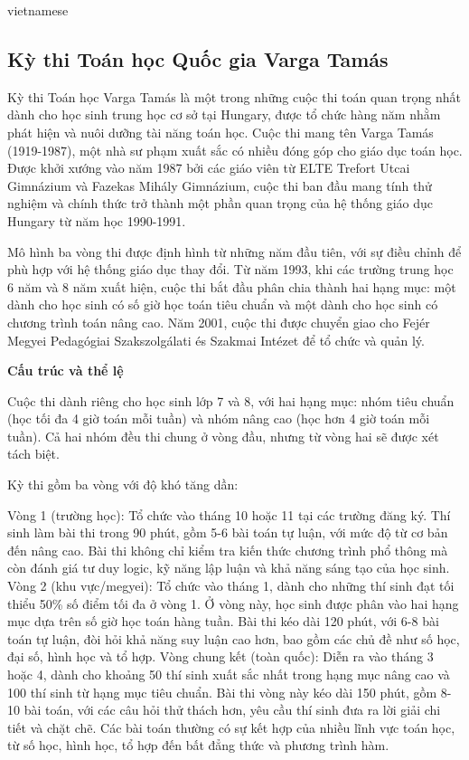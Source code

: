 \documentclass{article}
\begin{document}
\begin{otherlanguage*}{vietnamese}
\newpage

\subsection{Kỳ thi Toán học Quốc gia Varga Tamás}

Kỳ thi Toán học Varga Tamás là một trong những cuộc thi toán quan trọng nhất dành cho học sinh trung học cơ sở tại Hungary,
được tổ chức hàng năm nhằm phát hiện và nuôi dưỡng tài năng toán học. Cuộc thi mang tên Varga Tamás (1919-1987), một nhà sư phạm xuất sắc có nhiều đóng góp cho giáo dục toán học.
Được khởi xướng vào năm 1987 bởi các giáo viên từ ELTE Trefort Utcai Gimnázium và Fazekas Mihály Gimnázium,
cuộc thi ban đầu mang tính thử nghiệm và chính thức trở thành một phần quan trọng của hệ thống giáo dục Hungary từ năm học 1990-1991.

Mô hình ba vòng thi được định hình từ những năm đầu tiên, với sự điều chỉnh để phù hợp với hệ thống giáo dục thay đổi.
Từ năm 1993, khi các trường trung học 6 năm và 8 năm xuất hiện, cuộc thi bắt đầu phân chia thành hai hạng mục:
một dành cho học sinh có số giờ học toán tiêu chuẩn và một dành cho học sinh có chương trình toán nâng cao.
Năm 2001, cuộc thi được chuyển giao cho Fejér Megyei Pedagógiai Szakszolgálati és Szakmai Intézet để tổ chức và quản lý.

\textbf{Cấu trúc và thể lệ}

Cuộc thi dành riêng cho học sinh lớp 7 và 8, với hai hạng mục: nhóm tiêu chuẩn (học tối đa 4 giờ toán mỗi tuần) và nhóm nâng cao (học hơn 4 giờ toán mỗi tuần).
Cả hai nhóm đều thi chung ở vòng đầu, nhưng từ vòng hai sẽ được xét tách biệt.

Kỳ thi gồm ba vòng với độ khó tăng dần:
\begin{enumerate}[topsep=0pt, partopsep=0pt, itemsep=0pt]
    \ii Vòng 1 (trường học): Tổ chức vào tháng 10 hoặc 11 tại các trường đăng ký. Thí sinh làm bài thi trong 90 phút, gồm 5-6 bài toán tự luận, với mức độ từ cơ bản đến nâng cao.
    Bài thi không chỉ kiểm tra kiến thức chương trình phổ thông mà còn đánh giá tư duy logic, kỹ năng lập luận và khả năng sáng tạo của học sinh.
    \ii Vòng 2 (khu vực/megyei): Tổ chức vào tháng 1, dành cho những thí sinh đạt tối thiểu 50\% số điểm tối đa ở vòng 1.
    Ở vòng này, học sinh được phân vào hai hạng mục dựa trên số giờ học toán hàng tuần. Bài thi kéo dài 120 phút, với 6-8 bài toán tự luận, đòi hỏi khả năng suy luận cao hơn,
    bao gồm các chủ đề như số học, đại số, hình học và tổ hợp.
    \ii Vòng chung kết (toàn quốc): Diễn ra vào tháng 3 hoặc 4, dành cho khoảng 50 thí sinh xuất sắc nhất trong hạng mục nâng cao và 100 thí sinh từ hạng mục tiêu chuẩn.
    Bài thi vòng này kéo dài 150 phút, gồm 8-10 bài toán, với các câu hỏi thử thách hơn, yêu cầu thí sinh đưa ra lời giải chi tiết và chặt chẽ.
    Các bài toán thường có sự kết hợp của nhiều lĩnh vực toán học, từ số học, hình học, tổ hợp đến bất đẳng thức và phương trình hàm.
\end{enumerate}


\end{otherlanguage*}
\end{document}
